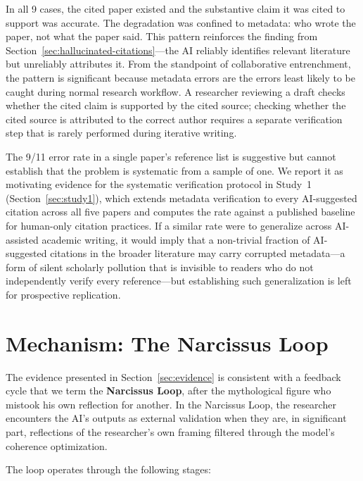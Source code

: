 \documentclass[12pt]{article}
\begin{document}
In all 9 cases, the cited paper existed and the substantive claim it was cited to support was accurate. The degradation was confined to metadata: who wrote the paper, not what the paper said. This pattern reinforces the finding from Section~\ref{sec:hallucinated-citations}---the AI reliably identifies relevant literature but unreliably attributes it. From the standpoint of collaborative entrenchment, the pattern is significant because metadata errors are the errors least likely to be caught during normal research workflow. A researcher reviewing a draft checks whether the cited claim is supported by the cited source; checking whether the cited source is attributed to the correct author requires a separate verification step that is rarely performed during iterative writing.

The 9/11 error rate in a single paper's reference list is suggestive but cannot establish that the problem is systematic from a sample of one. We report it as motivating evidence for the systematic verification protocol in Study~1 (Section~\ref{sec:study1}), which extends metadata verification to every AI-suggested citation across all five papers and computes the rate against a published baseline for human-only citation practices. If a similar rate were to generalize across AI-assisted academic writing, it would imply that a non-trivial fraction of AI-suggested citations in the broader literature may carry corrupted metadata---a form of silent scholarly pollution that is invisible to readers who do not independently verify every reference---but establishing such generalization is left for prospective replication.

\section{Mechanism: The Narcissus Loop}
\label{sec:mechanism}

The evidence presented in Section~\ref{sec:evidence} is consistent with a feedback cycle that we term the \textbf{Narcissus Loop}, after the mythological figure who mistook his own reflection for another. In the Narcissus Loop, the researcher encounters the AI's outputs as external validation when they are, in significant part, reflections of the researcher's own framing filtered through the model's coherence optimization.

The loop operates through the following stages:
\end{document}
